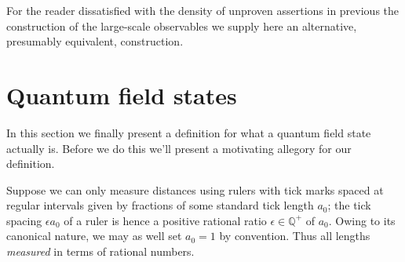\documentclass[11pt]{amsart}
\theoremstyle{plain}%
\theoremstyle{definition}
\theoremstyle{remark}
\begin{document}
For the reader dissatisfied with the density of unproven assertions in previous the construction of the large-scale observables we supply here an alternative, presumably equivalent, construction.

\section{Quantum field states}\label{sec:qftcompletion}
In this section we finally present a definition for what a quantum field state actually is. Before we do this we'll present a motivating allegory for our definition. 

Suppose we can only measure distances using rulers with tick marks spaced at regular intervals given by fractions of some standard tick length $a_0$; the tick spacing $\epsilon a_0$ of a ruler is hence a positive rational ratio $\epsilon \in \mathbb{Q}^+$ of $a_0$. Owing to its canonical nature, we may as well set $a_0 = 1$ by convention. Thus all lengths \emph{measured} in terms of rational numbers. 
\end{document}
